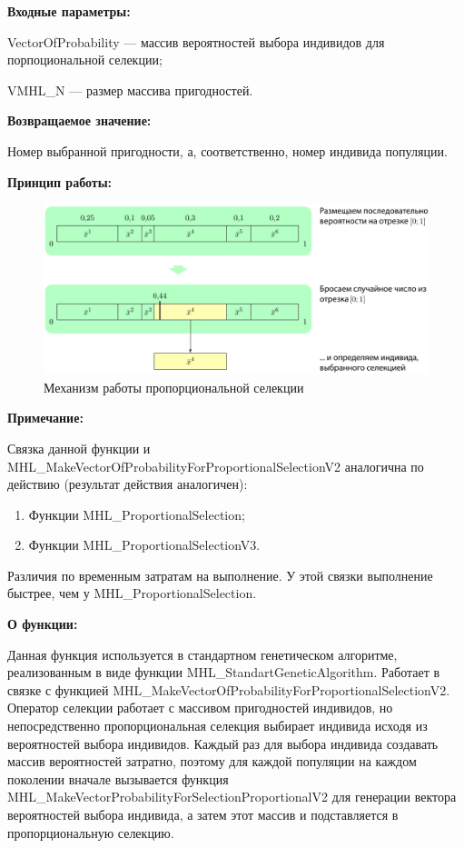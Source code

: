 \textbf{Входные параметры:}
 
 VectorOfProbability --- массив вероятностей выбора индивидов для порпоциональной селекции;
 
 VMHL\_N --- размер массива пригодностей.

\textbf{Возвращаемое значение:} 

Номер выбранной пригодности, а, соответственно, номер индивида популяции.

 \textbf{Принцип работы:}

\begin{figure} [h]
  \center
  \includegraphics [scale=0.8] {MHL_ProportionalSelection_Sheme}
  \caption{Механизм работы пропорциональной селекции} 
  \label{img:MHL_ProportionalSelection_Sheme}  
\end{figure}

\textbf{Примечание:}

Связка данной функции и MHL\_MakeVectorOfProbabilityForProportionalSelectionV2 аналогична по действию (результат действия аналогичен):
 
 \begin{enumerate}
\item Функции MHL\_ProportionalSelection;
\item Функции MHL\_ProportionalSelectionV3.
 \end{enumerate}
 
 Различия по временным затратам на выполнение. У этой связки выполнение быстрее, чем у MHL\_ProportionalSelection.
  
\textbf{О функции:}

 Данная функция используется в стандартном генетическом алгоритме, реализованным в виде функции MHL\_StandartGeneticAlgorithm. Работает в связке с функцией MHL\_MakeVectorOfProbabilityForProportionalSelectionV2. Оператор селекции работает с массивом пригодностей индивидов, но непосредственно пропорциональная селекция выбирает индивида исходя из вероятностей выбора индивидов. Каждый раз для выбора индивида создавать массив вероятностей затратно, поэтому для каждой популяции на каждом поколении вначале вызывается функция MHL\_MakeVectorProbabilityForSelectionProportionalV2 для генерации вектора вероятностей выбора индивида, а затем этот массив и подставляется в пропорциональную селекцию.

